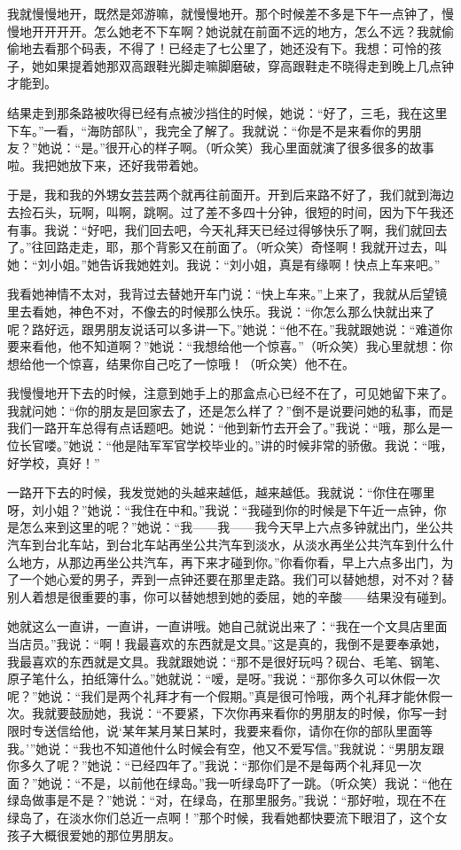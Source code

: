 \par 我就慢慢地开，既然是郊游嘛，就慢慢地开。那个时候差不多是下午一点钟了，慢慢地开开开开。怎么她老不下车啊？她说就在前面不远的地方，怎么不远？我就偷偷地去看那个码表，不得了！已经走了七公里了，她还没有下。我想：可怜的孩子，她如果提着她那双高跟鞋光脚走嘛脚磨破，穿高跟鞋走不晓得走到晚上几点钟才能到。
\par 结果走到那条路被吹得已经有点被沙挡住的时候，她说：“好了，三毛，我在这里下车。”一看，“海防部队”，我完全了解了。我就说：“你是不是来看你的男朋友？”她说：“是。”很开心的样子啊。（听众笑）我心里面就演了很多很多的故事啦。我把她放下来，还好我带着她。
\par 于是，我和我的外甥女芸芸两个就再往前面开。开到后来路不好了，我们就到海边去捡石头，玩啊，叫啊，跳啊。过了差不多四十分钟，很短的时间，因为下午我还有事。我说：“好吧，我们回去吧，今天礼拜天已经过得够快乐了啊，我们就回去了。”往回路走走，耶，那个背影又在前面了。（听众笑）奇怪啊！我就开过去，叫她：“刘小姐。”她告诉我她姓刘。我说：“刘小姐，真是有缘啊！快点上车来吧。”
\par 我看她神情不太对，我背过去替她开车门说：“快上车来。”上来了，我就从后望镜里去看她，神色不对，不像去的时候那么快乐。我说：“你怎么那么快就出来了呢？路好远，跟男朋友说话可以多讲一下。”她说：“他不在。”我就跟她说：“难道你要来看他，他不知道啊？”她说：“我想给他一个惊喜。”（听众笑）我心里就想：你想给他一个惊喜，结果你自己吃了一惊哦！（听众笑）他不在。
\par 我慢慢地开下去的时候，注意到她手上的那盒点心已经不在了，可见她留下来了。我就问她：“你的朋友是回家去了，还是怎么样了？”倒不是说要问她的私事，而是我们一路开车总得有点话题吧。她说：“他到新竹去开会了。”我说：“哦，那么是一位长官喽。”她说：“他是陆军军官学校毕业的。”讲的时候非常的骄傲。我说：“哦，好学校，真好！”
\par 一路开下去的时候，我发觉她的头越来越低，越来越低。我就说：“你住在哪里呀，刘小姐？”她说：“我住在中和。”我说：“我碰到你的时候是下午近一点钟，你是怎么来到这里的呢？”她说：“我——我——我今天早上六点多钟就出门，坐公共汽车到台北车站，到台北车站再坐公共汽车到淡水，从淡水再坐公共汽车到什么什么地方，从那边再坐公共汽车，再下来才碰到你。”你看你看，早上六点多出门，为了一个她心爱的男子，弄到一点钟还要在那里走路。我们可以替她想，对不对？替别人着想是很重要的事，你可以替她想到她的委屈，她的辛酸——结果没有碰到。
\par 她就这么一直讲，一直讲，一直讲哦。她自己就说出来了：“我在一个文具店里面当店员。”我说：“啊！我最喜欢的东西就是文具。”这是真的，我倒不是要奉承她，我最喜欢的东西就是文具。我就跟她说：“那不是很好玩吗？砚台、毛笔、钢笔、原子笔什么，拍纸簿什么。”她就说：“嗳，是呀。”我说：“那你多久可以休假一次呢？”她说：“我们是两个礼拜才有一个假期。”真是很可怜哦，两个礼拜才能休假一次。我就要鼓励她，我说：“不要紧，下次你再来看你的男朋友的时候，你写一封限时专送信给他，说‘某年某月某日某时，我要来看你，请你在你的部队里面等我。’”她说：“我也不知道他什么时候会有空，他又不爱写信。”我就说：“男朋友跟你多久了呢？”她说：“已经四年了。”我说：“那你们是不是每两个礼拜见一次面？”她说：“不是，以前他在绿岛。”我一听绿岛吓了一跳。（听众笑）我说：“他在绿岛做事是不是？”她说：“对，在绿岛，在那里服务。”我说：“那好啦，现在不在绿岛了，在淡水你们总近一点啊！”那个时候，我看她都快要流下眼泪了，这个女孩子大概很爱她的那位男朋友。
